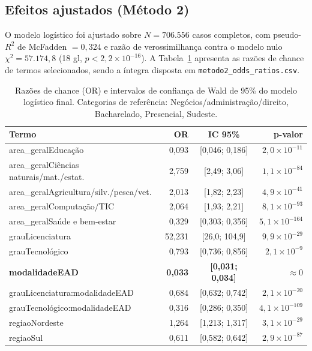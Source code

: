 \documentclass[12pt]{article}
\begin{document}
\subsection{Efeitos ajustados (Método 2)}
O modelo logístico foi ajustado sobre $N=706.556$ casos completos, com pseudo-$R^2$ de McFadden $=0{,}324$ e razão de verossimilhança contra o modelo nulo $\chi^2 = 57.174{,}8$ (18 gl, $p<2{,}2\times10^{-16}$). A Tabela~\ref{tab:or} apresenta as razões de chance de termos selecionados, sendo a íntegra disposta em \texttt{metodo2\_odds\_ratios.csv}.

\begin{table}[h]
\centering
\small
\begin{tabular}{lrcr}
\toprule
Termo & OR & IC 95\% & p-valor \\
\midrule
area\_geralEducação                        & 0,093 & [0,046; 0,186] & $2{,}0\times10^{-11}$ \\
area\_geralCiências naturais/mat./estat.   & 2,759 & [2,49; 3,06]   & $1{,}1\times10^{-84}$ \\
area\_geralAgricultura/silv./pesca/vet.    & 2,013 & [1,82; 2,23]   & $4{,}9\times10^{-41}$ \\
area\_geralComputação/TIC                  & 2,064 & [1,93; 2,21]   & $8{,}1\times10^{-93}$ \\
area\_geralSaúde e bem-estar               & 0,329 & [0,303; 0,356] & $5{,}1\times10^{-164}$ \\
grauLicenciatura                           & 52,231 & [26,0; 104,9] & $9{,}9\times10^{-29}$ \\
grauTecnológico                            & 0,793 & [0,736; 0,856] & $2{,}1\times10^{-9}$ \\
\textbf{modalidadeEAD}                     & \textbf{0,033} & \textbf{[0,031; 0,034]} & $\approx 0$ \\
grauLicenciatura:modalidadeEAD             & 0,684 & [0,632; 0,742] & $2{,}1\times10^{-20}$ \\
grauTecnológico:modalidadeEAD              & 0,316 & [0,286; 0,350] & $4{,}1\times10^{-109}$ \\
regiaoNordeste                             & 1,264 & [1,213; 1,317] & $3{,}1\times10^{-29}$ \\
regiaoSul                                  & 0,611 & [0,582; 0,642] & $2{,}9\times10^{-87}$ \\
\bottomrule
\end{tabular}
\caption{Razões de chance (OR) e intervalos de confiança de Wald de 95\% do modelo logístico final. Categorias de referência: Negócios/administração/direito, Bacharelado, Presencial, Sudeste.}
\label{tab:or}
\end{table}
\end{document}

